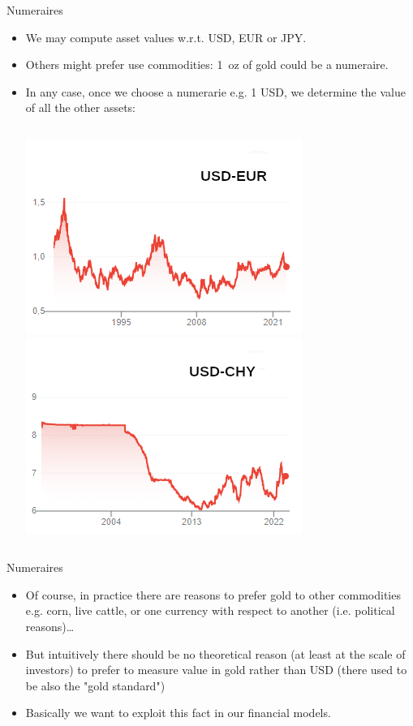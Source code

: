 \documentclass{beamer}
\begin{document}
\begin{frame}{Numeraires}
  \begin{itemize}
  \item We may compute asset values w.r.t. USD, EUR or JPY.
  \item Others might prefer use commodities: 1~oz of gold could be a numeraire.
  \item In any case, once we choose a numerarie e.g. 1 USD, we determine the value of all the other assets:
    \begin{columns}
      \includegraphics[width=0.9\linewidth]{images/usd_eur}
      \includegraphics[width=0.9\linewidth]{images/usd_chy}
    \end{columns}
  \end{itemize}
\end{frame}

\begin{frame}{Numeraires}
  \begin{itemize}
  \item Of course, in practice there are reasons to prefer gold to other commodities e.g. corn, live cattle, or one currency with respect to another (i.e. political reasons)\ldots
  \item But intuitively there should be no theoretical reason (at least at the scale of investors) to prefer to measure value in gold rather than USD (there used to be also the "gold standard")
  \item Basically we want to exploit this fact in our financial models.
  \end{itemize}
\end{frame}
\end{document}
